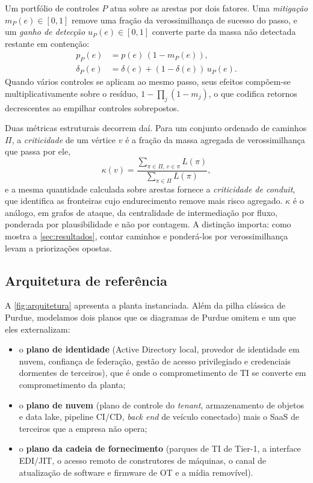Um portfólio de controles $P$ atua sobre as arestas por dois fatores. Uma
\emph{mitigação} $m_P(e) \in [0,1]$ remove uma fração da verossimilhança de
sucesso do passo, e um \emph{ganho de detecção} $u_P(e) \in [0,1]$ converte
parte da massa não detectada restante em contenção:
\begin{align}
p_P(e) &= p(e)\,(1 - m_P(e)), \\
\delta_P(e) &= \delta(e) + (1 - \delta(e))\,u_P(e).
\end{align}
Quando vários controles se aplicam ao mesmo passo, seus efeitos compõem-se
multiplicativamente sobre o resíduo, $1 - \prod_j (1-m_j)$, o que codifica
retornos decrescentes ao empilhar controles sobrepostos.

Duas métricas estruturais decorrem daí. Para um conjunto ordenado de caminhos
$\Pi$, a \emph{criticidade} de um vértice $v$ é a fração da massa agregada de
verossimilhança que passa por ele,
\begin{equation}
\kappa(v) = \frac{\sum_{\pi \in \Pi,\, v \in \pi} L(\pi)}{\sum_{\pi \in \Pi} L(\pi)},
\end{equation}
e a mesma quantidade calculada sobre arestas fornece a \emph{criticidade de
conduit}, que identifica as fronteiras cujo endurecimento remove mais risco
agregado. $\kappa$ é o análogo, em grafos de ataque, da centralidade de
intermediação por fluxo, ponderada por plausibilidade e não por contagem. A distinção importa: como
mostra a \cref{sec:resultados}, contar caminhos e ponderá-los por
verossimilhança levam a priorizações opostas.

\subsection{Arquitetura de referência}

A \cref{fig:arquitetura} apresenta a planta instanciada. Além da pilha clássica
de Purdue, modelamos dois planos que os diagramas de Purdue omitem e um que
eles externalizam:
\begin{itemize}
  \item o \textbf{plano de identidade} (Active Directory local, provedor de
    identidade em nuvem, confiança de federação, gestão de acesso privilegiado
    e credenciais dormentes de terceiros), que é onde o comprometimento de TI
    se converte em comprometimento da planta;
  \item o \textbf{plano de nuvem} (plano de controle do \emph{tenant},
    armazenamento de objetos e data lake, pipeline CI/CD, \emph{back end} de
    veículo conectado) mais o SaaS de terceiros que a empresa não opera;
  \item o \textbf{plano da cadeia de fornecimento} (parques de TI de Tier-1, a
    interface EDI/JIT, o acesso remoto de construtores de máquinas, o canal de
    atualização de software e firmware de OT e a mídia removível).
\end{itemize}

